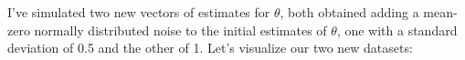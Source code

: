 \documentclass[]{book}
\newenvironment{Shaded}{\begin{snugshade}}{\end{snugshade}}
\newcommand{\DataTypeTok}[1]{\textcolor[rgb]{0.13,0.29,0.53}{#1}}
\newcommand{\DecValTok}[1]{\textcolor[rgb]{0.00,0.00,0.81}{#1}}
\newcommand{\FloatTok}[1]{\textcolor[rgb]{0.00,0.00,0.81}{#1}}
\newcommand{\KeywordTok}[1]{\textcolor[rgb]{0.13,0.29,0.53}{\textbf{#1}}}
\newcommand{\NormalTok}[1]{#1}
\newcommand{\OperatorTok}[1]{\textcolor[rgb]{0.81,0.36,0.00}{\textbf{#1}}}
\newcommand{\StringTok}[1]{\textcolor[rgb]{0.31,0.60,0.02}{#1}}
\theoremstyle{definition}
\theoremstyle{definition}
\theoremstyle{definition}
\theoremstyle{remark}
\begin{document}
\begin{Shaded}
\end{Shaded}

I've simulated two new vectors of estimates for \(\theta\), both obtained adding a mean-zero normally distributed noise to the initial estimates of \(\theta\), one with a standard deviation of 0.5 and the other of 1.
Let's visualize our two new datasets:
\end{document}
